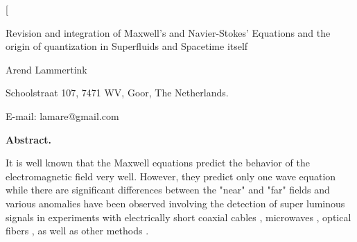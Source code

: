 \documentclass[twoside,final]{article}
\begin{document}

\renewcommand{\refname}{References}
\renewcommand{\tablename}{\small Table}
\renewcommand{\figurename}{\small Fig.}
\renewcommand{\contentsname}{Contents}


\twocolumn[%
\begin{center}
\renewcommand{\baselinestretch}{0.93}
{\Large\bfseries 

Revision and integration of Maxwell's and Navier-Stokes' Equations and the
origin of quantization in Superfluids and Spacetime itself



}\par
\renewcommand{\baselinestretch}{1.0}
\bigskip
Arend Lammertink\\ 
{\footnotesize  Schoolstraat 107, 7471 WV, Goor, The Netherlands.\rule{0pt}{12pt}
E-mail: lamare@gmail.com\\
}\par
\medskip
{\small\parbox{11cm}{%

\textbf{Abstract.} 

It is well known that the Maxwell equations predict the behavior of the
electromagnetic field very well. However, they predict only one wave equation
while there are significant differences between the "near" and "far" fields and
various anomalies have been observed involving the detection of super luminous
signals in experiments with electrically short coaxial cables 
\cite{Kuehn2019, Kuehn2020}, microwaves \cite{Ranfagni2004, Allaria2011, Agresti2015,
Mojahedi2000, Musha2019, Wang2003, Walker2006, Solemino2014, Ranfagni2006,
Walker2000}, optical fibers \cite{Gonzalez2005, Stenner2016, Thevenaz2008,
Wang2000}, as well as other methods \cite{Ardavan2004, Niang2018,
Wheatstone1834, Tesla1900}. 

}}
\end{center}
\end{document}
